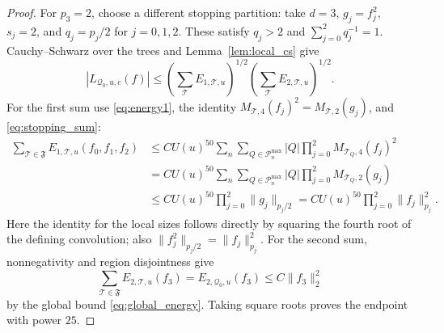 \documentclass[12pt,reqno]{amsart}
\theoremstyle{plain}
\theoremstyle{definition}
\theoremstyle{remark}
\numberwithin{equation}{section}
\newcommand{\T}{\mathcal T}
\begin{document}
\begin{proof}
For $p_3=2$, choose a different stopping partition: take $d=3$,
$g_j=f_j^2$, $s_j=2$, and $q_j=p_j/2$ for $j=0,1,2$.
These satisfy $q_j>2$ and $\sum_{j=0}^2q_j^{-1}=1$.
Cauchy--Schwarz over the trees and Lemma~\ref{lem:local_cs} give
\[
 |L_{\mathcal Q_0,u,c}(f)|\le
       \left(\sum_\T E_{1,\T,u}\right)^{1/2}
       \left(\sum_\T E_{2,\T,u}\right)^{1/2}.
\]
For the first sum use \eqref{eq:energy1}, the identity
$M_{\T,4}(f_j)^2=M_{\T,2}(g_j)$, and \eqref{eq:stopping_sum}:
\begin{align*}
 \sum_{\T\in\mathfrak F}E_{1,\T,u}(f_0,f_1,f_2)
 &\le C U(u)^{50}\sum_n\sum_{Q\in\mathcal P_n^{\max}}
                |Q|\prod_{j=0}^2M_{\T_Q,4}(f_j)^2\\
 &=C U(u)^{50}\sum_n\sum_{Q\in\mathcal P_n^{\max}}
                |Q|\prod_{j=0}^2M_{\T_Q,2}(g_j)\\
 &\le C U(u)^{50}\prod_{j=0}^2\|g_j\|_{p_j/2}
  = C U(u)^{50}\prod_{j=0}^2\|f_j\|_{p_j}^2.
\end{align*}
Here the identity for the local sizes follows directly by squaring
the fourth root of the defining convolution; also
$\|f_j^2\|_{p_j/2}=\|f_j\|_{p_j}^2$. For the second sum,
nonnegativity and region disjointness give
\[
 \sum_{\T\in\mathfrak F}E_{2,\T,u}(f_3)
 =E_{2,\mathcal Q_0,u}(f_3)
 \le C\|f_3\|_2^2
\]
by the global bound \eqref{eq:global_energy}.
Taking square roots proves the endpoint with power $25$.
\end{proof}
\end{document}
